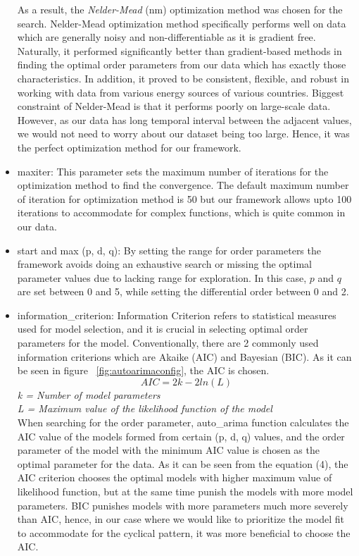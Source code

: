 \documentclass[]{usiinfbachelorproject}
\begin{document}
\begin{itemize}
As a result, the \textit{Nelder-Mead} (nm) optimization method was chosen for the search. Nelder-Mead optimization method specifically performs well on data which are generally noisy and non-differentiable as it is gradient free. Naturally, it performed significantly better than gradient-based methods in finding the optimal order parameters from our data which has exactly those characteristics. In addition, it proved to be consistent, flexible, and robust in working with data from various energy sources of various countries. Biggest constraint of Nelder-Mead is that it performs poorly on large-scale data. However, as our data has long temporal interval between the adjacent values, we would not need to worry about our dataset being too large. Hence, it was the perfect optimization method for our framework.\\

\item maxiter: This parameter sets the maximum number of iterations for the optimization method to find the convergence. The default maximum number of iteration for optimization method is 50 but our framework allows upto 100 iterations to accommodate for complex functions, which is quite common in our data.

\item start and max (p, d, q): By setting the range for order parameters the framework avoids doing an exhaustive search or missing the optimal parameter values due to lacking range for exploration. In this case, $p$ and $q$ are set between 0 and 5, while setting the differential order between 0 and 2. \\

\item information\_criterion: Information Criterion refers to statistical measures used for model selection, and it is crucial in selecting optimal order parameters for the model. Conventionally, there are 2 commonly used information criterions which are Akaike (AIC) and Bayesian (BIC). As it can be seen in figure ~\ref{fig:autoarimaconfig}, the AIC is chosen.\\

\begin{equation}
    AIC = 2k - 2ln(L) 
\end{equation}
\textit{k = Number of model parameters}\\
\textit{L = Maximum value of the likelihood function of the model}\\

When searching for the order parameter, auto\_arima function calculates the AIC value of the models formed from certain (p, d, q) values, and the order parameter of the model with the minimum AIC value is chosen as the optimal parameter for the data. As it can be seen from the equation (4), the AIC criterion chooses the optimal models with higher maximum value of likelihood function, but at the same time punish the models with more model parameters. BIC punishes models with more parameters much more severely than AIC, hence, in our case where we would like to prioritize the model fit to accommodate for the cyclical pattern, it was more beneficial to choose the AIC.\\
\end{itemize}
\end{document}
